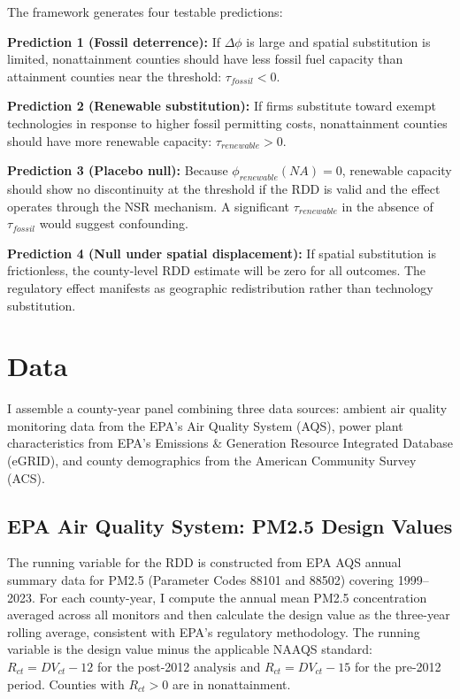 \documentclass[12pt]{article}
\begin{document}
The framework generates four testable predictions:

\textbf{Prediction 1 (Fossil deterrence):} If $\Delta\phi$ is large and spatial substitution is limited, nonattainment counties should have less fossil fuel capacity than attainment counties near the threshold: $\tau_{fossil} < 0$.

\textbf{Prediction 2 (Renewable substitution):} If firms substitute toward exempt technologies in response to higher fossil permitting costs, nonattainment counties should have more renewable capacity: $\tau_{renewable} > 0$.

\textbf{Prediction 3 (Placebo null):} Because $\phi_{renewable}(NA) = 0$, renewable capacity should show no discontinuity at the threshold if the RDD is valid and the effect operates through the NSR mechanism. A significant $\tau_{renewable}$ in the absence of $\tau_{fossil}$ would suggest confounding.

\textbf{Prediction 4 (Null under spatial displacement):} If spatial substitution is frictionless, the county-level RDD estimate will be zero for all outcomes. The regulatory effect manifests as geographic redistribution rather than technology substitution.


\section{Data}
\label{sec:data}

I assemble a county-year panel combining three data sources: ambient air quality monitoring data from the EPA's Air Quality System (AQS), power plant characteristics from EPA's Emissions \& Generation Resource Integrated Database (eGRID), and county demographics from the American Community Survey (ACS).

\subsection{EPA Air Quality System: PM2.5 Design Values}

The running variable for the RDD is constructed from EPA AQS annual summary data for PM2.5 (Parameter Codes 88101 and 88502) covering 1999--2023. For each county-year, I compute the annual mean PM2.5 concentration averaged across all monitors and then calculate the design value as the three-year rolling average, consistent with EPA's regulatory methodology. The running variable is the design value minus the applicable NAAQS standard: $R_{ct} = DV_{ct} - 12$ for the post-2012 analysis and $R_{ct} = DV_{ct} - 15$ for the pre-2012 period. Counties with $R_{ct} > 0$ are in nonattainment.
\end{document}
